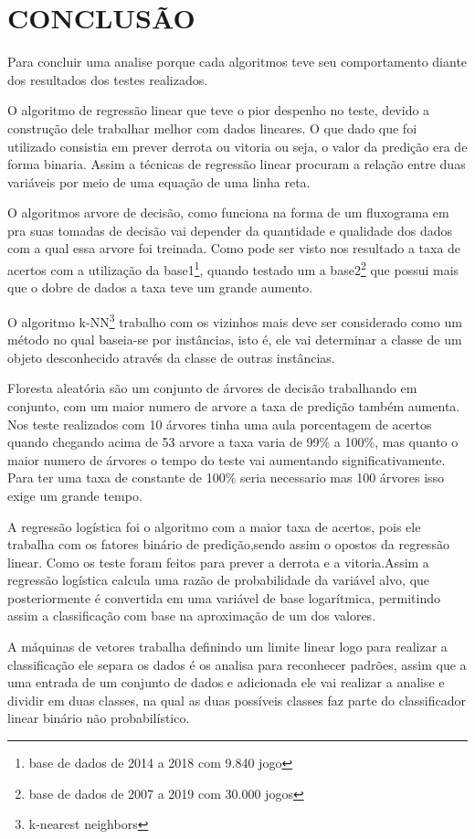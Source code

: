 \newpage
\section{CONCLUSÃO}
Para concluir uma analise porque cada algoritmos teve seu comportamento diante dos resultados dos testes realizados. 

O algoritmo de regressão linear que teve o pior despenho no teste, devido a construção dele trabalhar melhor com dados lineares. O que dado que foi utilizado consistia em prever derrota ou vitoria ou seja, o valor da predição era de forma binaria. Assim a técnicas de regressão linear procuram a relação entre duas variáveis por meio de uma equação de uma linha reta.

O algoritmos arvore de decisão, como funciona na forma de um fluxograma em pra suas tomadas de decisão vai depender da quantidade e qualidade dos dados com a qual essa arvore foi treinada. Como pode ser visto nos resultado a taxa de acertos com a utilização da base1\footnote[4]{base de dados de 2014 a 2018 com 9.840 jogo}, quando testado um a base2\footnote[5]{base de dados de 2007 a 2019 com 30.000 jogos} que possui mais que o dobre de dados a taxa teve um grande aumento.

O algoritmo k-NN\footnote[3]{k-nearest neighbors} trabalho com os vizinhos mais deve ser considerado como um método
no qual baseia-se por instâncias, isto é, ele vai determinar a classe de um objeto
desconhecido através da classe de outras instâncias.

Floresta aleatória são um conjunto de árvores de decisão trabalhando em conjunto, com um maior numero de arvore a taxa de predição também aumenta. Nos teste realizados com 10 árvores tinha uma aula porcentagem de acertos quando chegando acima de 53 arvore a taxa varia de 99\% a 100\%, mas quanto o maior numero de árvores o tempo do teste vai aumentando significativamente. Para ter uma taxa de constante de 100\% seria necessario mas 100 árvores isso exige um grande tempo.

A regressão logística foi o algoritmo com a maior taxa de acertos, pois ele trabalha com os fatores binário de predição,sendo assim o opostos da regressão linear. Como os teste foram feitos para prever a derrota e a vitoria.Assim a regressão logística calcula uma razão de probabilidade da variável alvo, que posteriormente é convertida em uma variável de base logarítmica, permitindo assim a classificação com base na aproximação de um dos valores. 

A máquinas de vetores trabalha definindo um limite linear logo para realizar a
classificação ele separa os dados é os analisa para reconhecer padrões, assim que a uma entrada de um conjunto de dados e adicionada ele vai realizar a analise e dividir em duas classes, na qual as duas possíveis classes faz parte do classificador linear binário não probabilístico.





